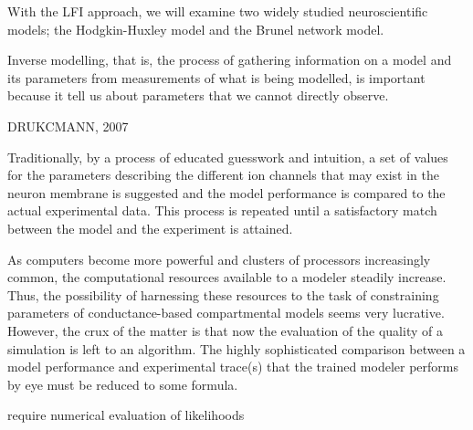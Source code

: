 With the LFI approach, we will examine two widely studied neuroscientific models; the Hodgkin-Huxley model and the Brunel network model. 


Inverse modelling, that is, the process of gathering information on a model and its parameters from measurements of what is being modelled, is important because it tell us about parameters that we cannot directly observe.  


DRUKCMANN, 2007 

Traditionally, by a process of educated guesswork and intuition, a set of values for the parameters describing the different ion channels that may exist in the neuron membrane is suggested and the model performance is compared to the actual experimental data. This process is repeated until a satisfactory match between the model and the experiment is attained.

As computers become more powerful and clusters of processors increasingly common, the computational resources available to a modeler steadily increase. Thus, the possibility of harnessing these resources to the task of constraining parameters of conductance-based compartmental models seems very lucrative. However, the crux of the matter is that now the evaluation of the quality of a simulation is left to an algorithm. The highly sophisticated comparison between a model performance and experimental trace(s) that the trained modeler performs by eye must be reduced to some formula.





require numerical evaluation of likelihoods

